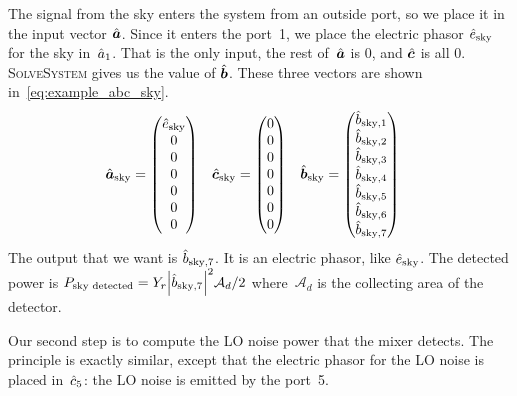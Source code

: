The signal from the sky enters the system from an outside port, so we place it in the input vector $\hat{\bm{a}}$.
Since it enters the port~1, we place the electric phasor $\hat{e}_\text{sky}$ for the sky in~$\hat{a}_1$.
That is the only input, the rest of~$\hat{\bm{a}}$ is 0, and $\hat{\bm{c}}$ is all 0.
\textsc{SolveSystem} gives us the value of $\hat{\bm{b}}$.
These three vectors are shown in~\cref{eq:example_abc_sky}.
\begin{align}
    \hat{\bm{a}}_\text{sky}
    &=
    \begin{pmatrix}
        \hat{e}_\text{sky} \\ 0 \\ 0 \\ 0 \\ 0 \\ 0 \\ 0
    \end{pmatrix}
    &
    \hat{\bm{c}}_\text{sky}
    &=
    \begin{pmatrix}
        0 \\ 0 \\ 0 \\ 0 \\ 0 \\ 0 \\ 0
    \end{pmatrix}
    &
    \hat{\bm{b}}_\text{sky}
    &=
    \begin{pmatrix}
        \hat{b}_{\text{sky},1}\\
        \hat{b}_{\text{sky},2}\\
        \hat{b}_{\text{sky},3}\\
        \hat{b}_{\text{sky},4}\\
        \hat{b}_{\text{sky},5}\\
        \hat{b}_{\text{sky},6}\\
        \hat{b}_{\text{sky},7}
    \end{pmatrix}
    \label{eq:example_abc_sky}
\end{align}
The output that we want is $\hat{b}_{\text{sky},7}$.
It is an electric phasor, like $\hat{e}_\text{sky}$.
The detected power is
$P_\text{sky detected} = Y_r\abs{\cp{b}_{\text{sky},7}}^2 \mathcal{A}_d/ 2$
where~$\mathcal{A}_d$ is the collecting area of the detector.

Our second step is to compute the LO noise power that the mixer detects.
The principle is exactly similar, except that the electric phasor for the LO noise is placed in~$\hat{c}_5$: the LO noise is emitted by the port~5.

